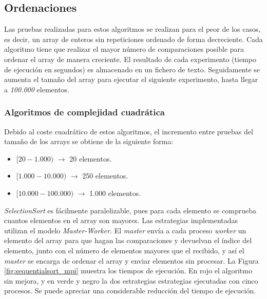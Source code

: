	\subsection{Ordenaciones}
	
	Las pruebas realizadas para estos algoritmos se realizan para el peor de los casos, es decir, un array de enteros sin repeticiones ordenado de forma decreciente. Cada algoritmo tiene que realizar el mayor número de comparaciones posible para ordenar el array de manera creciente. El resultado de cada experimento (tiempo de ejecución en segundos) es almacenado en un fichero de texto. Seguidamente se aumenta el tamaño del array para ejecutar el siguiente experimento, hasta llegar a \textit{100.000} elementos.	
	
		\subsubsection{Algoritmos de complejidad cuadrática}		
		\label{cap:4_2_1_1}
		
		Debido al coste cuadrático de estos algoritmos, el incremento entre pruebas del tamaño de los arrays se obtiene de la siguiente forma:
		\begin{itemize}
			\vspace*{-0.2cm}	
			\item \([20-1.000)\) $\rightarrow$ 20 elementos.
			\vspace*{-0.4cm}	
			\item \([1.000-10.000)\) $\rightarrow$ 250 elementos.
			\vspace*{-0.4cm}	
			\item \([10.000-100.000)\) $\rightarrow$ 1.000 elementos.					
		\end{itemize}
		
		
		
		\textit{SelectionSort} es fácilmente paralelizable, pues para cada elemento se comprueba cuantos elementos en el array son mayores. Las estrategias implementadas utilizan el modelo \textit{Master-Worker}. El \textit{master} envía a cada proceso \textit{worker} un elemento del array para que hagan las comparaciones y devuelvan el índice del elemento, junto con el número de elementos mayores que el recibido, y así el \textit{master} se encarga de ordenar el array y enviar elementos sin procesar. La Figura \ref{fig:sequentialsort_mpi} muestra los tiempos de ejecución. En rojo el algoritmo sin mejora, y en verde y negro la dos estrategias estrategias ejecutadas con cinco procesos. Se puede apreciar una considerable reducción del tiempo de ejecución. 
		
